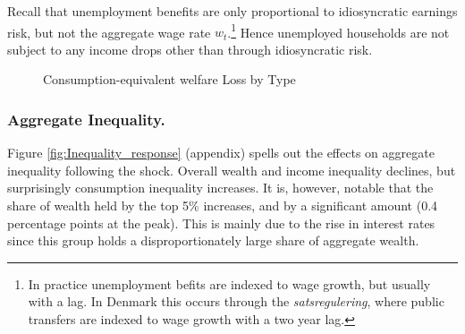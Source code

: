 

Recall that unemployment benefits are only proportional to idiosyncratic earnings risk, but not the aggregate wage rate $w_t$.\footnote{In practice unemployment befits are indexed to wage growth, but usually with a lag. In Denmark this occurs through the \textit{satsregulering}, where public transfers are indexed to wage growth with a two year lag.} Hence unemployed households are not subject to any income drops other than through idiosyncratic risk. 


\begin{figure}[H]
\caption[Caption for LOF]{Consumption-equivalent welfare Loss by Type}
\label{fig:C_equiv_Baseline}
\centering

\end{figure}


\subsubsection{Aggregate Inequality.} Figure \ref{fig:Inequality_response} (appendix) spells out the effects on aggregate inequality following the shock. Overall wealth and income inequality declines, but surprisingly consumption inequality increases. It is, however, notable that the share of wealth held by the top 5\% increases, and by a significant amount (0.4 percentage points at the peak). This is mainly due to the rise in interest rates since this group holds a disproportionately large share of aggregate wealth.     




